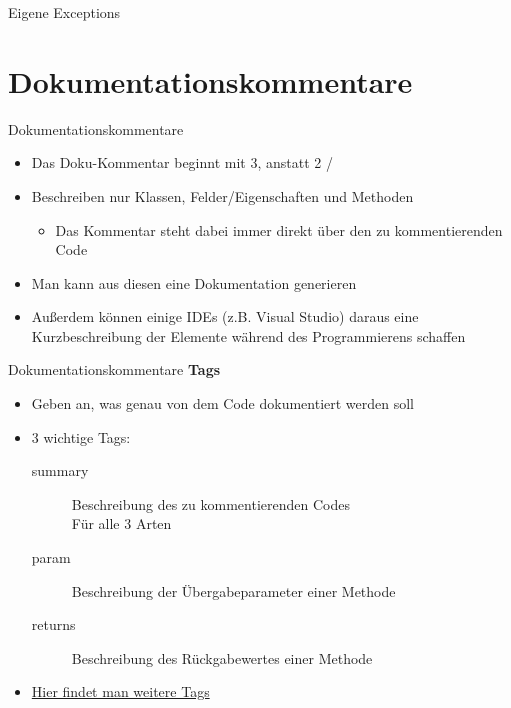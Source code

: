 \begin{frame}{Eigene Exceptions}
	
\end{frame}

\section{Dokumentationskommentare}
\begin{frame}{Dokumentationskommentare}
	\begin{itemize}
		\item Das Doku-Kommentar beginnt mit 3, anstatt 2 \alert{/}
		\item Beschreiben nur Klassen, Felder/Eigenschaften und Methoden
		\begin{itemize}
			\item Das Kommentar steht dabei immer direkt über den zu kommentierenden Code
		\end{itemize}
		\item Man kann aus diesen eine Dokumentation generieren
		\item Außerdem können einige IDEs (z.B. Visual Studio) daraus eine Kurzbeschreibung der Elemente während des Programmierens schaffen		
	\end{itemize}
\end{frame}

\begin{frame}{Dokumentationskommentare}
	\textbf{Tags}
	\begin{itemize}
		\item Geben an, was genau von dem Code dokumentiert werden soll
		\item 3 wichtige Tags:
		\begin{description}
			\item[summary] Beschreibung des zu kommentierenden Codes\\ Für alle 3 Arten
			\item[param] Beschreibung der Übergabeparameter einer Methode
			\item[returns] Beschreibung des Rückgabewertes einer Methode
		\end{description}
		\item \href{https://msdn.microsoft.com/de-de/library/5ast78ax.aspx}{Hier findet man weitere Tags}
	\end{itemize}
\end{frame}

